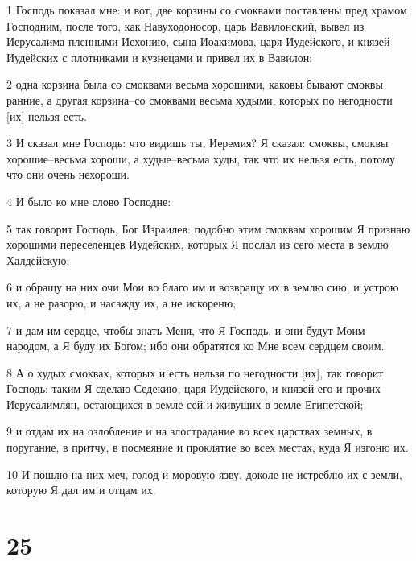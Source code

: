 \par 1 Господь показал мне: и вот, две корзины со смоквами поставлены пред храмом Господним, после того, как Навуходоносор, царь Вавилонский, вывел из Иерусалима пленными Иехонию, сына Иоакимова, царя Иудейского, и князей Иудейских с плотниками и кузнецами и привел их в Вавилон:
\par 2 одна корзина была со смоквами весьма хорошими, каковы бывают смоквы ранние, а другая корзина--со смоквами весьма худыми, которых по негодности [их] нельзя есть.
\par 3 И сказал мне Господь: что видишь ты, Иеремия? Я сказал: смоквы, смоквы хорошие--весьма хороши, а худые--весьма худы, так что их нельзя есть, потому что они очень нехороши.
\par 4 И было ко мне слово Господне:
\par 5 так говорит Господь, Бог Израилев: подобно этим смоквам хорошим Я признаю хорошими переселенцев Иудейских, которых Я послал из сего места в землю Халдейскую;
\par 6 и обращу на них очи Мои во благо им и возвращу их в землю сию, и устрою их, а не разорю, и насажду их, а не искореню;
\par 7 и дам им сердце, чтобы знать Меня, что Я Господь, и они будут Моим народом, а Я буду их Богом; ибо они обратятся ко Мне всем сердцем своим.
\par 8 А о худых смоквах, которых и есть нельзя по негодности [их], так говорит Господь: таким Я сделаю Седекию, царя Иудейского, и князей его и прочих Иерусалимлян, остающихся в земле сей и живущих в земле Египетской;
\par 9 и отдам их на озлобление и на злострадание во всех царствах земных, в поругание, в притчу, в посмеяние и проклятие во всех местах, куда Я изгоню их.
\par 10 И пошлю на них меч, голод и моровую язву, доколе не истреблю их с земли, которую Я дал им и отцам их.

\chapter{25}

